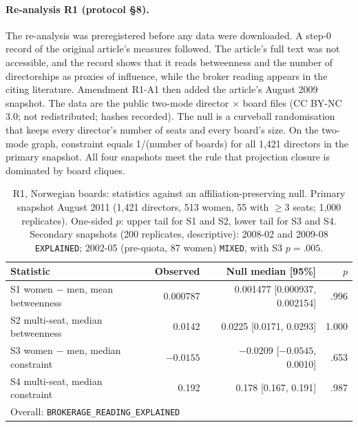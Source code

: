 \paragraph{Re-analysis R1 (protocol \S8).} The re-analysis was preregistered before any data were downloaded. A step-0 record of the original article's measures followed. The article's full text was not accessible, and the record shows that it reads betweenness and the number of directorships as proxies of influence, while the broker reading appears in the citing literature. Amendment R1-A1 then added the article's August 2009 snapshot. The data are the public two-mode director $\times$ board files (CC BY-NC 3.0; not redistributed; hashes recorded). The null is a curveball randomisation that keeps every director's number of seats and every board's size. On the two-mode graph, constraint equals 1/(number of boards) for all 1,421 directors in the primary snapshot. All four snapshots meet the rule that projection closure is dominated by board cliques.

\begin{table}[htbp]
  \centering
  \caption{R1, Norwegian boards: statistics against an affiliation-preserving null. Primary snapshot August 2011 (1,421 directors, 513 women, 55 with $\geq 3$ seats; 1,000 replicates). One-sided $p$: upper tail for S1 and S2, lower tail for S3 and S4. Secondary snapshots (200 replicates, descriptive): 2008-02 and 2009-08 \texttt{EXPLAINED}; 2002-05 (pre-quota, 87 women) \texttt{MIXED}, with S3 $p=.005$.}
  \label{tab:app_r1}
  \small
  \begin{tabular}{lrrr}
    \toprule
    Statistic & Observed & Null median [95\%] & $p$ \\
    \midrule
    S1 women $-$ men, mean betweenness & 0.000787 & 0.001477 [0.000937, 0.002154] & .996 \\
    S2 multi-seat, median betweenness & 0.0142 & 0.0225 [0.0171, 0.0293] & 1.000 \\
    S3 women $-$ men, median constraint & $-0.0155$ & $-0.0209$ [$-0.0545$, 0.0010] & .653 \\
    S4 multi-seat, median constraint & 0.192 & 0.178 [0.167, 0.191] & .987 \\
    \midrule
    \multicolumn{4}{l}{Overall: \texttt{BROKERAGE\_\allowbreak READING\_\allowbreak EXPLAINED}} \\
    \bottomrule
  \end{tabular}
\end{table}
